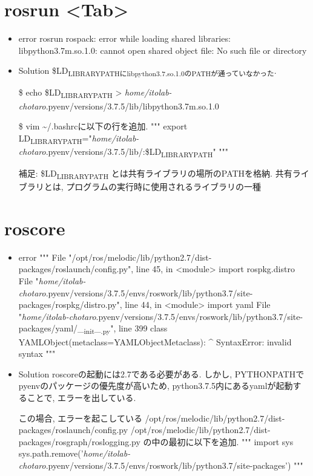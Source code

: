 \documentclass[11pt]{article}
\begin{document}
\section{rosrun <Tab>}
\label{sec:org4cf52df}
\begin{itemize}
\item error
rosrun rospack: error while loading shared libraries: libpython3.7m.so.1.0: cannot open shared object file: No such file or directory

\item Solution
\$LD\textsubscript{LIBRARY}\textsubscript{PATHにlibpython3.7.so.1.0のPATHが通っていなかった}.

\$ echo \$LD\textsubscript{LIBRARY}\textsubscript{PATH}
> \emph{home/itolab-chotaro}.pyenv/versions/3.7.5/lib/libpython3.7m.so.1.0

\$ vim \textasciitilde{}/.bashrcに以下の行を追加.
"""
export LD\textsubscript{LIBRARY}\textsubscript{PATH}="\emph{home/itolab-chotaro}.pyenv/versions/3.7.5/lib/:\$LD\textsubscript{LIBRARY}\textsubscript{PATH}"
"""

補足:
    \$LD\textsubscript{LIBRARY}\textsubscript{PATH} とは共有ライブラリの場所のPATHを格納.
    共有ライブラリとは, プログラムの実行時に使用されるライブラリの一種
\end{itemize}

\section{roscore}
\label{sec:org5dfdc8d}
\begin{itemize}
\item error
"""
File "/opt/ros/melodic/lib/python2.7/dist-packages/roslaunch/config.py", line 45, in <module>
  import rospkg.distro
File "\emph{home/itolab-chotaro}.pyenv/versions/3.7.5/envs/roswork/lib/python3.7/site-packages/rospkg/distro.py", line 44, in <module>
  import yaml
File "\emph{home/itolab-chotaro}.pyenv/versions/3.7.5/envs/roswork/lib/python3.7/site-packages/yaml/\_\textsubscript{init}\_\textsubscript{.py}", line 399
  class YAMLObject(metaclass=YAMLObjectMetaclass):
                            \^{}
SyntaxError: invalid syntax
"""

\item Solution
roscoreの起動には2.7である必要がある.
しかし, PYTHONPATHでpyenvのパッケージの優先度が高いため, python3.7.5内にあるyamlが起動することで, エラーを出している.

この場合, エラーを起こしている
/opt/ros/melodic/lib/python2.7/dist-packages/roslaunch/config.py
/opt/ros/melodic/lib/python2.7/dist-packages/rosgraph/roslogging.py
の中の最初に以下を追加.
"""
import sys
sys.path.remove('\emph{home/itolab-chotaro}.pyenv/versions/3.7.5/envs/roswork/lib/python3.7/site-packages')
"""
\end{itemize}
\end{document}
